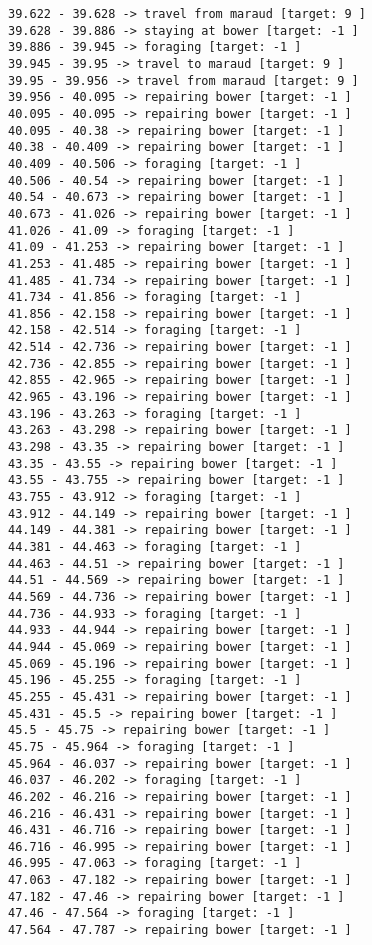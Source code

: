 \documentclass[11pt]{article}
\begin{document}
\begin{Verbatim}[commandchars=\\\{\}]
39.622 - 39.628 -> travel from maraud [target: 9 ]
39.628 - 39.886 -> staying at bower [target: -1 ]
39.886 - 39.945 -> foraging [target: -1 ]
39.945 - 39.95 -> travel to maraud [target: 9 ]
39.95 - 39.956 -> travel from maraud [target: 9 ]
39.956 - 40.095 -> repairing bower [target: -1 ]
40.095 - 40.095 -> repairing bower [target: -1 ]
40.095 - 40.38 -> repairing bower [target: -1 ]
40.38 - 40.409 -> repairing bower [target: -1 ]
40.409 - 40.506 -> foraging [target: -1 ]
40.506 - 40.54 -> repairing bower [target: -1 ]
40.54 - 40.673 -> repairing bower [target: -1 ]
40.673 - 41.026 -> repairing bower [target: -1 ]
41.026 - 41.09 -> foraging [target: -1 ]
41.09 - 41.253 -> repairing bower [target: -1 ]
41.253 - 41.485 -> repairing bower [target: -1 ]
41.485 - 41.734 -> repairing bower [target: -1 ]
41.734 - 41.856 -> foraging [target: -1 ]
41.856 - 42.158 -> repairing bower [target: -1 ]
42.158 - 42.514 -> foraging [target: -1 ]
42.514 - 42.736 -> repairing bower [target: -1 ]
42.736 - 42.855 -> repairing bower [target: -1 ]
42.855 - 42.965 -> repairing bower [target: -1 ]
42.965 - 43.196 -> repairing bower [target: -1 ]
43.196 - 43.263 -> foraging [target: -1 ]
43.263 - 43.298 -> repairing bower [target: -1 ]
43.298 - 43.35 -> repairing bower [target: -1 ]
43.35 - 43.55 -> repairing bower [target: -1 ]
43.55 - 43.755 -> repairing bower [target: -1 ]
43.755 - 43.912 -> foraging [target: -1 ]
43.912 - 44.149 -> repairing bower [target: -1 ]
44.149 - 44.381 -> repairing bower [target: -1 ]
44.381 - 44.463 -> foraging [target: -1 ]
44.463 - 44.51 -> repairing bower [target: -1 ]
44.51 - 44.569 -> repairing bower [target: -1 ]
44.569 - 44.736 -> repairing bower [target: -1 ]
44.736 - 44.933 -> foraging [target: -1 ]
44.933 - 44.944 -> repairing bower [target: -1 ]
44.944 - 45.069 -> repairing bower [target: -1 ]
45.069 - 45.196 -> repairing bower [target: -1 ]
45.196 - 45.255 -> foraging [target: -1 ]
45.255 - 45.431 -> repairing bower [target: -1 ]
45.431 - 45.5 -> repairing bower [target: -1 ]
45.5 - 45.75 -> repairing bower [target: -1 ]
45.75 - 45.964 -> foraging [target: -1 ]
45.964 - 46.037 -> repairing bower [target: -1 ]
46.037 - 46.202 -> foraging [target: -1 ]
46.202 - 46.216 -> repairing bower [target: -1 ]
46.216 - 46.431 -> repairing bower [target: -1 ]
46.431 - 46.716 -> repairing bower [target: -1 ]
46.716 - 46.995 -> repairing bower [target: -1 ]
46.995 - 47.063 -> foraging [target: -1 ]
47.063 - 47.182 -> repairing bower [target: -1 ]
47.182 - 47.46 -> repairing bower [target: -1 ]
47.46 - 47.564 -> foraging [target: -1 ]
47.564 - 47.787 -> repairing bower [target: -1 ]

\end{Verbatim}
\end{document}
